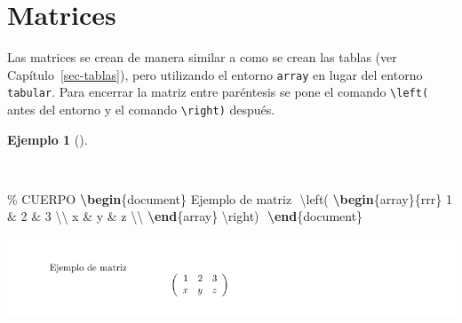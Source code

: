 \documentclass[
  a4paper,
]{scrreport}
\newenvironment{Shaded}{\begin{snugshade}}{\end{snugshade}}
\newcommand{\CommentTok}[1]{\textcolor[rgb]{0.37,0.37,0.37}{#1}}
\newcommand{\ExtensionTok}[1]{\textcolor[rgb]{0.00,0.23,0.31}{#1}}
\newcommand{\KeywordTok}[1]{\textcolor[rgb]{0.00,0.23,0.31}{\textbf{#1}}}
\newcommand{\NormalTok}[1]{\textcolor[rgb]{0.00,0.23,0.31}{#1}}
\newcommand{\SpecialCharTok}[1]{\textcolor[rgb]{0.37,0.37,0.37}{#1}}
\newcommand{\SpecialStringTok}[1]{\textcolor[rgb]{0.13,0.47,0.30}{#1}}
\theoremstyle{definition}
\newtheorem{example}{Ejemplo}[chapter]
\theoremstyle{remark}
\begin{document}
\section{Matrices}\label{matrices}

Las matrices se crean de manera similar a como se crean las tablas (ver
Capítulo~\ref{sec-tablas}), pero utilizando el entorno \texttt{array} en
lugar del entorno \texttt{tabular}. Para encerrar la matriz entre
paréntesis se pone el comando \texttt{\textbackslash{}left(} antes del
entorno y el comando \texttt{\textbackslash{}right)} después.

\begin{example}[]\protect\hypertarget{exm-matrices}{}\label{exm-matrices}

~

\begin{Shaded}
\begin{Highlighting}[]
\CommentTok{\% CUERPO}
\KeywordTok{\textbackslash{}begin}\NormalTok{\{}\ExtensionTok{document}\NormalTok{\}}
\NormalTok{Ejemplo de matriz}
\SpecialStringTok{$$}
\SpecialCharTok{\textbackslash{}left}\SpecialStringTok{(}
\KeywordTok{\textbackslash{}begin}\NormalTok{\{}\ExtensionTok{array}\NormalTok{\}}\SpecialStringTok{\{rrr\}}
\SpecialStringTok{1 \& 2 \& 3 }\SpecialCharTok{\textbackslash{}\textbackslash{}}
\SpecialStringTok{x \& y \& z }\SpecialCharTok{\textbackslash{}\textbackslash{}}
\KeywordTok{\textbackslash{}end}\NormalTok{\{}\ExtensionTok{array}\NormalTok{\}}
\SpecialCharTok{\textbackslash{}right}\SpecialStringTok{)}
\SpecialStringTok{$$}
\KeywordTok{\textbackslash{}end}\NormalTok{\{}\ExtensionTok{document}\NormalTok{\}}
\end{Highlighting}
\end{Shaded}

\begin{tcolorbox}[enhanced jigsaw, colframe=quarto-callout-note-color-frame, opacityback=0, title={Salida}, bottomrule=.15mm, left=2mm, coltitle=black, arc=.35mm, leftrule=.75mm, colback=white, rightrule=.15mm, colbacktitle=quarto-callout-note-color!10!white, toprule=.15mm, breakable, opacitybacktitle=0.6, bottomtitle=1mm, toptitle=1mm, titlerule=0mm]

\includegraphics{img/formulas/matriz.png}

\end{tcolorbox}

\end{example}
\end{document}
